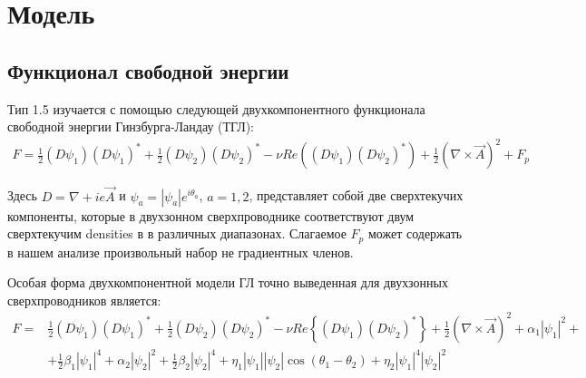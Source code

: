 \chapter{Модель}
\label{ch:2}

\section{Функционал свободной энергии}
\label{sec:2-1}

Тип 1.5 изучается с помощью следующей двухкомпонентного функционала 
свободной энергии Гинзбурга-Ландау (ТГЛ):
\begin{align}
	F = \frac{1}{2}(D\psi_1)(D\psi_1)^* + \frac{1}{2}(D\psi_2)(D\psi_2)^* - 
		\nu Re\left( (D\psi_1)(D\psi_2)^* \right) + 
		\frac{1}{2}\left(\nabla\times\vec{A}\right)^2 + F_p
	\label{eq:1}
\end{align}

Здесь \( D = \nabla + ie\vec{A} \) и \( \psi_a = |\psi_a|e^{i\theta_a} \), 
\( a = 1,2 \), представляет собой две сверхтекучих компоненты, которые в 
двухзонном сверхпроводнике соответствуют двум сверхтекучим densities в 
в различных диапазонах. Слагаемое \( F_p \) может содержать в нашем 
анализе произвольный набор не градиентных членов.

Особая форма двухкомпонентной модели ГЛ точно 
выведенная\cite{bib:8,bib:9,bib:10} для двухзонных сверхпроводников является:
\begin{align}
	F = & \frac{1}{2}(D\psi_1)(D\psi_1)^* + \frac{1}{2}(D\psi_2)(D\psi_2)^* - 
		\nu Re\left\{ (D\psi_1)(D\psi_2)^* \right\} + 
		\frac{1}{2}\left(\nabla\times\vec{A}\right)^2 + \alpha_1|\psi_1|^2 + 
		\nonumber \\
		& + \frac{1}{2}\beta_1|\psi_1|^4 + \alpha_2|\psi_2|^2 + 
		\frac{1}{2}\beta_2|\psi_2|^4 + \eta_1|\psi_1||\psi_2|
		\cos(\theta_1-\theta_2) + \eta_2|\psi_1|^4|\psi_2|^2
	\label{eq:2}
\end{align}

